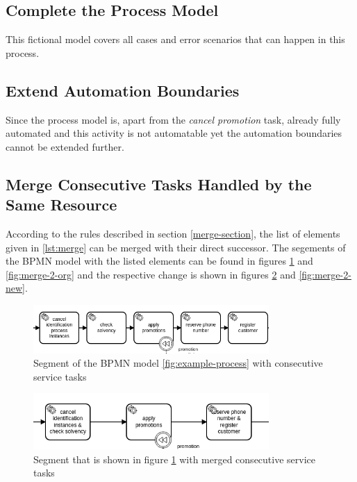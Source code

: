 \subsection{Complete the Process Model}
This fictional model covers all cases and error scenarios that can happen in this process.

\subsection{Extend Automation Boundaries}
Since the process model is, apart from the \textit{cancel promotion} task, already fully automated  and this activity is not automatable yet the automation boundaries cannot be extended further. 

\subsection{Merge Consecutive Tasks Handled by the Same Resource}
According to the rules described in section \ref{merge-section}, the list of elements given in \ref{lst:merge} can be merged with their direct successor. The segements of the BPMN model with the listed elements can be found in figures \ref{fig:merge-1-org} and \ref{fig:merge-2-org} and the respective change is shown in figures \ref{fig:merge-1-new} and \ref{fig:merge-2-new}. 
\begin{figure}[H]
	\centering
	\includegraphics[width=0.8\textwidth]{graphics/case-study-merge-org-1}
	\caption{Segment of the BPMN model \ref{fig:example-process} with consecutive service tasks}
	\label{fig:merge-1-org}
\end{figure}

\begin{figure}[H]
	\centering
	\includegraphics[width=0.8\textwidth]{graphics/case-study-merge-new-1}
	\caption{Segment that is shown in figure \ref{fig:merge-1-org} with merged consecutive service tasks}
	\label{fig:merge-1-new}
\end{figure}

